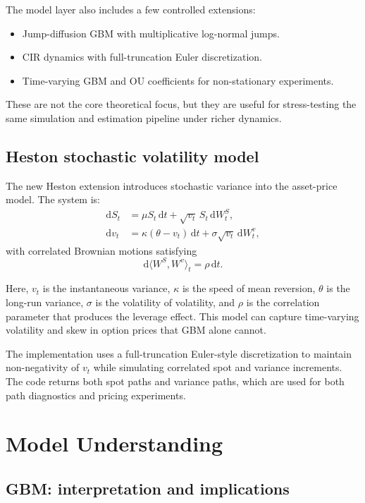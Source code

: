 \documentclass[11pt]{article}
\newcommand{\dd}{\mathrm{d}}
\begin{document}
The model layer also includes a few controlled extensions:
\begin{itemize}[leftmargin=1.2em]
  \item Jump-diffusion GBM with multiplicative log-normal jumps.
  \item CIR dynamics with full-truncation Euler discretization.
  \item Time-varying GBM and OU coefficients for non-stationary experiments.
\end{itemize}

These are not the core theoretical focus, but they are useful for stress-testing the same simulation and estimation pipeline under richer dynamics.

\subsection{Heston stochastic volatility model}

The new Heston extension introduces stochastic variance into the asset-price model. The system is:
\begin{align}
  \dd S_t &= \mu S_t \,\dd t + \sqrt{v_t} \, S_t \,\dd W_t^S, \\
  \dd v_t &= \kappa(\theta - v_t)\,\dd t + \sigma\sqrt{v_t} \,\dd W_t^v,
\end{align}
with correlated Brownian motions satisfying
\begin{equation}
  \dd\langle W^S, W^v \rangle_t = \rho\,\dd t.
\end{equation}

Here, $v_t$ is the instantaneous variance, $\kappa$ is the speed of mean reversion, $\theta$ is the long-run variance, $\sigma$ is the volatility of volatility, and $\rho$ is the correlation parameter that produces the leverage effect. This model can capture time-varying volatility and skew in option prices that GBM alone cannot.

The implementation uses a full-truncation Euler-style discretization to maintain non-negativity of $v_t$ while simulating correlated spot and variance increments. The code returns both spot paths and variance paths, which are used for both path diagnostics and pricing experiments.

\section{Model Understanding}

\subsection{GBM: interpretation and implications}
\end{document}
